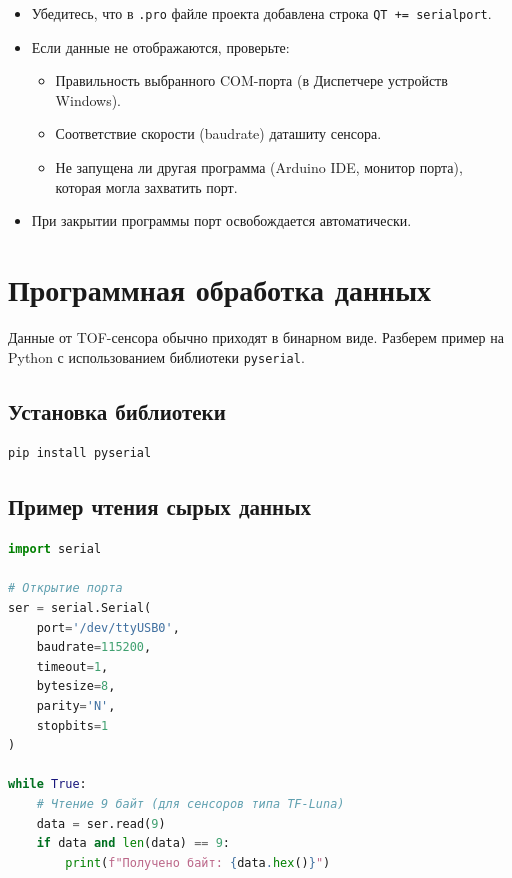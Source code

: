 \documentclass[12pt,a4paper]{article}
\begin{document}
\begin{tcolorbox}[colback=red!5!white, colframe=red!75!black, title=Важно!]
\begin{itemize}
    \item Убедитесь, что в \texttt{.pro} файле проекта добавлена строка \texttt{QT += serialport}.
    \item Если данные не отображаются, проверьте:
    \begin{itemize}
        \item Правильность выбранного COM-порта (в Диспетчере устройств Windows).
        \item Соответствие скорости (baudrate) даташиту сенсора.
        \item Не запущена ли другая программа (Arduino IDE, монитор порта), которая могла захватить порт.
    \end{itemize}
    \item При закрытии программы порт освобождается автоматически.
\end{itemize}
\end{tcolorbox}

\section{Программная обработка данных}

Данные от TOF-сенсора обычно приходят в бинарном виде. Разберем пример на Python с использованием библиотеки \texttt{pyserial}.

\subsection{Установка библиотеки}
\begin{lstlisting}[language=bash]
pip install pyserial
\end{lstlisting}

\subsection{Пример чтения сырых данных}
\begin{lstlisting}[language=Python]
import serial

# Открытие порта
ser = serial.Serial(
    port='/dev/ttyUSB0',
    baudrate=115200,
    timeout=1,
    bytesize=8,
    parity='N',
    stopbits=1
)

while True:
    # Чтение 9 байт (для сенсоров типа TF-Luna)
    data = ser.read(9)
    if data and len(data) == 9:
        print(f"Получено байт: {data.hex()}")
\end{lstlisting}
\end{document}
